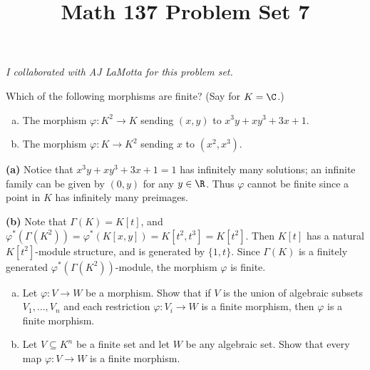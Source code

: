 \documentclass[11pt,letterpaper]{article}
\title{\textbf{Math 137 Problem Set 7}}
\begin{document}
\maketitle

\begin{center}
    \textit{I collaborated with AJ LaMotta for this problem set.}
\end{center}

\begin{problem}
    Which of the following morphisms are finite? (Say for $K=\C$.)
    \begin{enumerate}[(a)]
        \item The morphism $\varphi : K^2\rightarrow K$ sending $(x,y)$ to $x^3 y + x y^3 + 3x + 1$.
        \item The morphism $\varphi: K\rightarrow K^2$ sending $x$ to $(x^2,x^3)$.
    \end{enumerate}
\end{problem}
\begin{solution}
    \textbf{(a)} Notice that $x^3y+xy^3+3x+1=1$ has infinitely many solutions; an infinite family can be given by $(0,y)$ for any $y\in \R$. Thus $\varphi$ cannot be finite since a point in $K$ has infinitely many preimages. 
   
    \textbf{(b)} Note that $\Gamma(K)=K[t]$, and $\varphi^*(\Gamma(K^2))=\varphi^*(K[x,y])=K[t^2, t^3]=K[t^2]$. Then $K[t]$ has a natural $K[t^2]$-module structure, and is generated by $\{1,t\}$. Since $\Gamma(K)$ is a finitely generated $\varphi^*(\Gamma(K^2))$-module, the morphism $\varphi$ is finite.  
\end{solution}
    
\begin{problem}\noindent
    \begin{enumerate}[(a)]
        \item Let $\varphi:V\rightarrow W$ be a morphism. Show that if $V$ is the union of algebraic subsets $V_1,\dots,V_n$ and each restriction $\varphi:V_i\rightarrow W$ is a finite morphism, then $\varphi$ is a finite morphism.
        \item Let $V\subseteq K^n$ be a finite set and let $W$ be any algebraic set. Show that every map $\varphi:V\rightarrow W$ is a finite morphism.
    \end{enumerate}
\end{problem}
\end{document}
